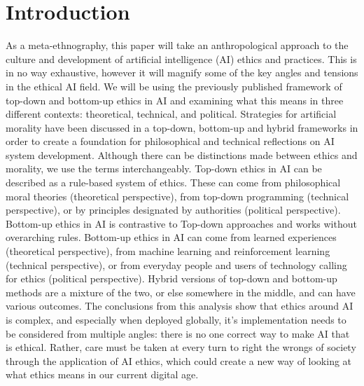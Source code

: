 \documentclass{svproc}
\begin{document}
\section{Introduction}
%
As a meta-ethnography, this paper will take an anthropological approach to the culture and development of artificial intelligence (AI) ethics and practices. This is in no way exhaustive, however it will magnify some of the key angles and tensions in the ethical AI field. We will be using the previously published \cite{Allen2005ArtificialApproaches} \cite{Wallach2008MachineFaculties} framework of top-down and bottom-up ethics in AI and examining what this means in three different contexts: theoretical, technical, and political. Strategies for artificial morality have been discussed in a top-down, bottom-up and hybrid frameworks in order to create a foundation for philosophical and technical reflections on AI system development. \cite{Allen2005ArtificialApproaches} \cite{Wallach2008MachineFaculties}  Although there can be distinctions made between ethics and morality, we use the terms interchangeably. Top-down ethics in AI can be described as a rule-based system of ethics. These can come from philosophical moral theories (theoretical perspective), from top-down programming (technical perspective), \cite{Allen2005ArtificialApproaches} or by principles designated by authorities (political perspective). Bottom-up ethics in AI is contrastive to Top-down approaches and works without overarching rules. Bottom-up ethics in AI can come from learned experiences (theoretical perspective), from machine learning and reinforcement learning (technical perspective), \cite{Allen2005ArtificialApproaches}  or from everyday people and users of technology calling for ethics (political perspective). Hybrid versions of top-down and bottom-up methods are a mixture of the two, or else somewhere in the middle, and can have various outcomes. The conclusions from this analysis show that ethics around AI is complex, and especially when deployed globally, it's implementation needs to be considered from multiple angles: there is no one correct way to make AI that is ethical. Rather, care must be taken at every turn to right the wrongs of society through the application of AI ethics, which could create a new way of looking at what ethics means in our current digital age.
\end{document}
